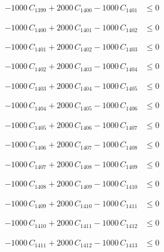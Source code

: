 \documentclass[a4paper,11pt]{article}
\begin{document}
\begin{align}
-1000\,C_{1399} + 2000\,C_{1400} - 1000\,C_{1401} &\leq 0 \nonumber
\end{align}

\begin{align}
-1000\,C_{1400} + 2000\,C_{1401} - 1000\,C_{1402} &\leq 0 \nonumber
\end{align}

\begin{align}
-1000\,C_{1401} + 2000\,C_{1402} - 1000\,C_{1403} &\leq 0 \nonumber
\end{align}

\begin{align}
-1000\,C_{1402} + 2000\,C_{1403} - 1000\,C_{1404} &\leq 0 \nonumber
\end{align}

\begin{align}
-1000\,C_{1403} + 2000\,C_{1404} - 1000\,C_{1405} &\leq 0 \nonumber
\end{align}

\begin{align}
-1000\,C_{1404} + 2000\,C_{1405} - 1000\,C_{1406} &\leq 0 \nonumber
\end{align}

\begin{align}
-1000\,C_{1405} + 2000\,C_{1406} - 1000\,C_{1407} &\leq 0 \nonumber
\end{align}

\begin{align}
-1000\,C_{1406} + 2000\,C_{1407} - 1000\,C_{1408} &\leq 0 \nonumber
\end{align}

\begin{align}
-1000\,C_{1407} + 2000\,C_{1408} - 1000\,C_{1409} &\leq 0 \nonumber
\end{align}

\begin{align}
-1000\,C_{1408} + 2000\,C_{1409} - 1000\,C_{1410} &\leq 0 \nonumber
\end{align}

\begin{align}
-1000\,C_{1409} + 2000\,C_{1410} - 1000\,C_{1411} &\leq 0 \nonumber
\end{align}

\begin{align}
-1000\,C_{1410} + 2000\,C_{1411} - 1000\,C_{1412} &\leq 0 \nonumber
\end{align}

\begin{align}
-1000\,C_{1411} + 2000\,C_{1412} - 1000\,C_{1413} &\leq 0 \nonumber
\end{align}
\end{document}
